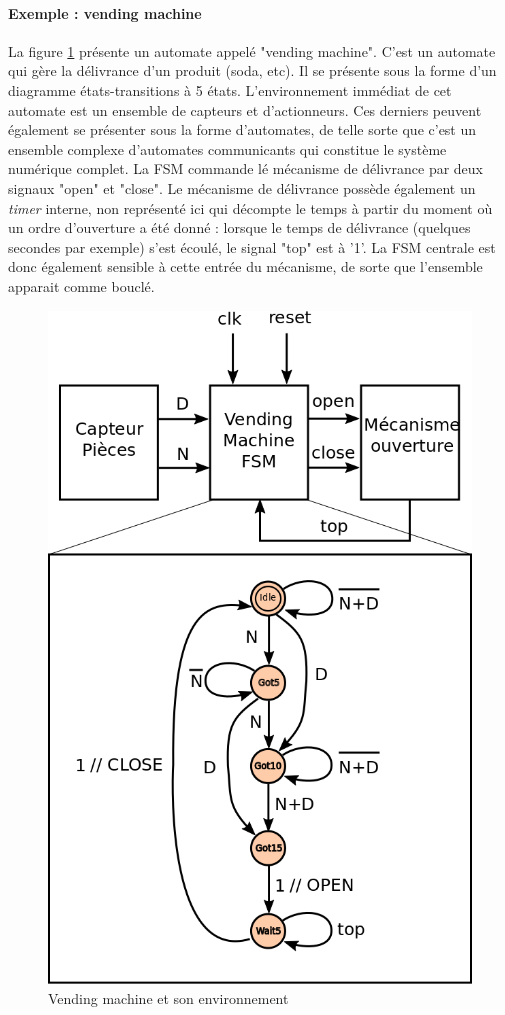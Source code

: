 \paragraph{Exemple : vending machine}
La figure \ref{fig:vending_machine} présente un automate appelé "vending machine". C'est un automate qui gère la délivrance d'un produit (soda, etc). Il se présente sous la forme d'un diagramme
états-transitions à 5 états. L'environnement immédiat de cet automate est un ensemble de capteurs et d'actionneurs. Ces derniers peuvent également se présenter sous la forme d'automates, de telle
sorte que c'est un ensemble complexe d'automates communicants qui constitue le système numérique complet. La FSM commande lé mécanisme de délivrance par deux signaux "open" et "close". Le mécanisme
de délivrance possède également un {\it timer} interne, non représenté ici qui décompte le temps à partir du moment où un ordre d'ouverture a été donné : lorsque le temps de délivrance (quelques secondes par exemple)
s'est écoulé, le signal "top" est à '1'. La FSM centrale est donc également sensible à cette entrée du mécanisme, de sorte que l'ensemble apparait comme bouclé.

\begin{figure}[h]
  \centering
  \includegraphics[scale=0.3]{./figures/vending_machine.png}
  \caption{Vending machine et son environnement}
  \label{fig:vending_machine}
\end{figure}

